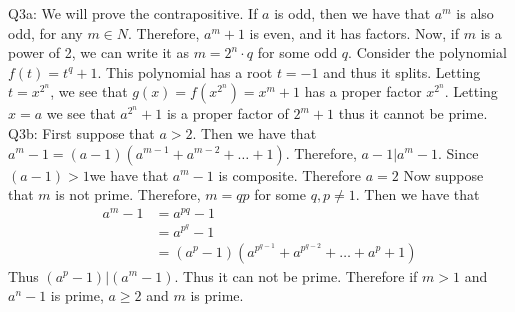 \documentclass[letterpaper]{article}
\begin{document}
\noindent Q3a: We will prove the contrapositive. If $a$ is odd, then we have that $a^m$ is also odd, for any $m\in N$. Therefore, $a^m+1$ is even, and it has factors. 
Now, if $m$ is a power of 2, we can write it as $m=2^n\cdot q$ for some odd $q$. Consider the polynomial $f(t) = t^q+1$.  This polynomial has a root $t=-1$ and thus it splits. 
Letting $t=x^{2^n}$, we see that $g(x)=f(x^{2^n})=x^m+1$ has a proper factor $x^{2^n}$. Letting $x=a$ we see that $a^{2^n}+1$ is a proper factor of $2^m+1$ thus it cannot be prime. 
\newline \\ Q3b: First suppose that $a>2$. Then we have that $a^m-1 = (a-1)(a^{m-1} + a^{m-2}+ \dots + 1)$. Therefore, $a-1| a^m-1$. Since $(a-1)>1$we have that $a^m-1$ is composite. Therefore $a=2$
Now suppose that $m$ is not prime. Therefore, $m=qp$ for some $q,p\neq 1$. Then we have that 
\begin{align*}
    a^m-1 & = a^{pq}-1
    \\ & = a^{p^q}-1
    \\ & = (a^p-1)(a^{p^{q-1}} + a^{p^{q-2}} + \dots +a^p+1)
\end{align*}
Thus $(a^p-1)|(a^m-1)$. Thus it can not be prime. Therefore if $m>1$ and $a^n-1$ is prime, $a\geq 2$ and $m$ is prime. 
\end{document}

